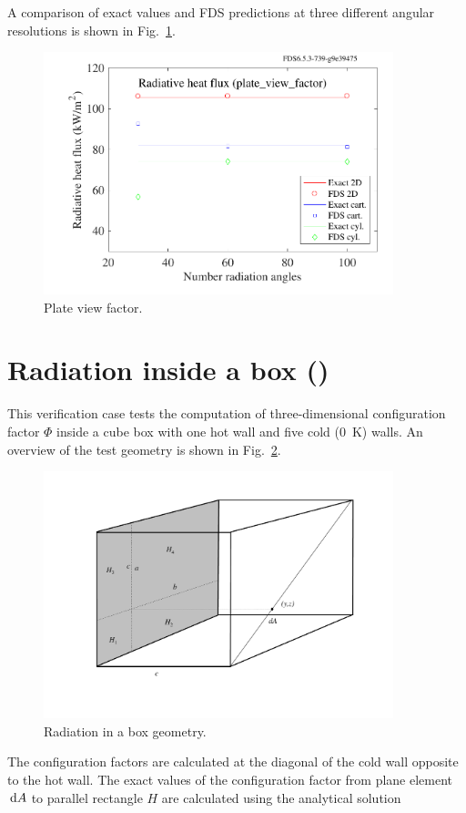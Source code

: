 \documentclass[11pt]{book}
\begin{document}
A comparison of exact values and FDS predictions at three different angular resolutions is shown in Fig.~\ref{fig_plate_view_factor}.
\begin{figure}
\centering
\includegraphics[width=4.0in]{SCRIPT_FIGURES/plate_view_factor}
\caption{\label{fig_plate_view_factor}Plate view factor.}
\end{figure}



\clearpage


\section{Radiation inside a box (\texorpdfstring{}{radiation\_in\_a\_box}) }
\label{radiation_in_a_box}

This verification case tests the computation of three-dimensional configuration factor $\Phi$ inside a cube box with one hot wall and five cold (0~K)
walls. An overview of the test geometry is shown in Fig.~\ref{fig_box_radiation}.
\begin{figure}
\centering
\includegraphics[width=4.0in]{FIGURES/box}
\caption{\label{fig_box_radiation} Radiation in a box geometry.}
\end{figure}
The configuration factors are calculated at the diagonal of the cold wall opposite to the hot wall. The exact values of the configuration factor from
plane element $\,\mathrm{d} A$ to parallel rectangle $H$ are calculated using the analytical solution~\cite{Siegel:1}
\end{document}

